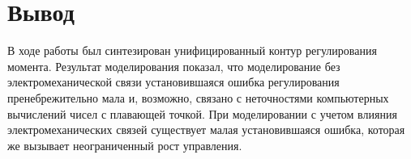 \section{Вывод}

В ходе работы был синтезирован унифицированный контур регулирования момента.
Результат моделирования показал, что моделирование без электромеханической связи установившаяся ошибка регулирования пренебрежительно мала и, возможно, связано с неточностями компьютерных вычислений чисел с плавающей точкой.
При моделировании с учетом влияния электромеханических связей существует малая установившаяся ошибка, которая же вызывает неограниченный рост управления.